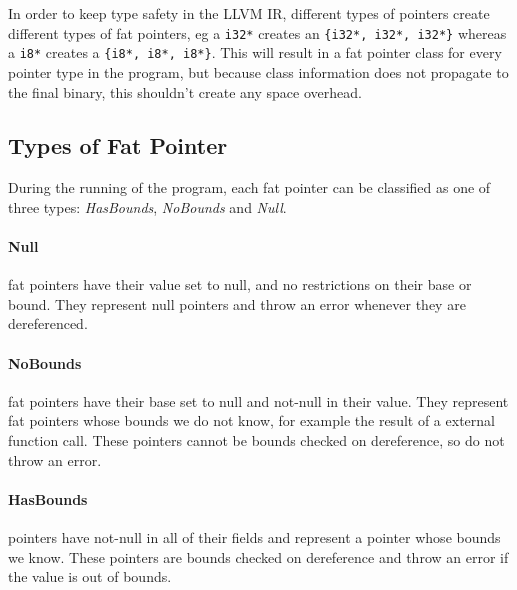 In order to keep type safety in the LLVM IR, different types of pointers create different types of fat pointers, eg a \verb!i32*! creates an \verb!{i32*, i32*, i32*}! whereas a \verb!i8*! creates a \verb!{i8*, i8*, i8*}!.
This will result in a fat pointer class for every pointer type in the program, but because class information does not propagate to the final binary, this shouldn't create any space overhead.


\subsection{Types of Fat Pointer}

During the running of the program, each fat pointer can be classified as one of three types: \textit{HasBounds}, \textit{NoBounds} and \textit{Null}.

\paragraph{Null} fat pointers have their value set to null, and no restrictions on their base or bound.
They represent null pointers and throw an error whenever they are dereferenced.

\paragraph{NoBounds} fat pointers have their base set to null and not-null in their value.
They represent fat pointers whose bounds we do not know, for example the result of a external function call.
These pointers cannot be bounds checked on dereference, so do not throw an error.

\paragraph{HasBounds} pointers have not-null in all of their fields and represent a pointer whose bounds we know.
These pointers are bounds checked on dereference and throw an error if the value is out of bounds.

